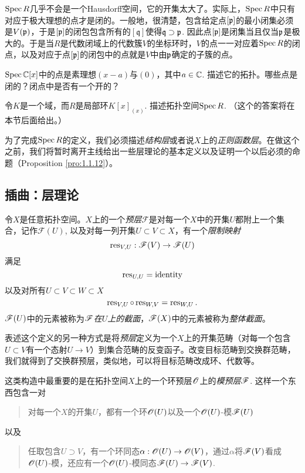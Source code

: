 $\operatorname{Spec} R$几乎不会是一个Hausdorff空间，它的开集太大了。实际上，$\operatorname{Spec} R$中只有对应于极大理想的点才是闭的。一般地，很清楚，包含给定点$[\mathfrak{p}]$的最小闭集必须是$V(\mathfrak{p})$，于是$[\mathfrak{p}]$的闭包包含所有的$[\mathfrak{q}]$使得$\mathfrak{q}\supset\mathfrak{p}$. 因此点$[\mathfrak{p}]$是闭集当且仅当$\mathfrak{p}$是极大的。于是当$R$是代数闭域上的代数簇$V$的坐标环时，$V$的点一一对应着$\operatorname{Spec} R$的闭点，以及对应于点$[\mathfrak{p}]$的闭包中的点就是$V$中由$\mathfrak{p}$确定的子簇的点。

\begin{exe}
	\begin{compactenum}[{(a)}]
		\item $\operatorname{Spec} \mathbb{C}[x]$中的点是素理想$(x-a)$与$(0)$，其中$a\in\mathbb{C}$. 描述它的拓扑。哪些点是闭的？闭点中是否有一个开的？
		\item 令$K$是一个域，而$R$是局部环$K[x]_{(x)}$. 描述拓扑空间$\operatorname{Spec} R$. （这个的答案将在本节后面给出。）
	\end{compactenum}
\end{exe}

为了完成$\operatorname{Spec} R$的定义，我们必须描述\textit{结构层}或者说$X$上的\textit{正则函数层}。在做这个之前，我们将暂时离开主线给出一些层理论的基本定义以及证明一个以后必须的命题（Proposition \ref{pro:1.1.12}）。

\subsection{插曲：层理论}

令$X$是任意拓扑空间。$X$上的一个\textit{预层}$\mathscr{F}$是对每一个$X$中的开集$U$都附上一个集合，记作$\mathscr{F}(U)$, 以及对每一列开集$U\subset V\subset X$，有一个\textit{限制映射}
\[
	\operatorname{res}_{V,U}:\mathscr{F}(V)\to \mathscr{F}(U)
\]
满足
\[
	\operatorname{res}_{U,U}=\mathrm{identity}
\]
以及对所有$U\subset V\subset W\subset X$
\[
	\operatorname{res}_{V,U}\circ \operatorname{res}_{W,V}=\operatorname{res}_{W,U}.
\]
$\mathscr{F}(U)$中的元素被称为\textit{$\mathscr{F}$在$U$上的截面}，$\mathscr{F}(X)$中的元素被称为\textit{整体截面}。

表述这个定义的另一种方式是将\textit{预层}定义为一个$X$上的开集范畴（对每一个包含$U\subset V$有一个态射$U\to V$）到集合范畴的反变函子。改变目标范畴到交换群范畴，我们就得到了交换群预层，类似地，可以将目标范畴改成环、代数等。

这类构造中最重要的是在拓扑空间$X$上的一个环预层$\mathscr{O}$上的\textit{模预层}$\mathscr{F}$. 这样一个东西包含一对
\begin{quote}
对每一个$X$的开集$U$，都有一个环$\mathscr{O}(U)$以及一个$\mathscr{O}(U)$-模$\mathscr{F}(U)$
\end{quote}
以及
\begin{quote}
任取包含$U\supset V$，有一个环同态$\alpha:\mathscr{O}(U)\to\mathscr{O}(V)$，通过$\alpha$将$\mathscr{F}(V)$看成$\mathscr{O}(U)$-模，还应有一个$\mathscr{O}(U)$-模同态$\mathscr{F}(U)\to\mathscr{F}(V)$.
\end{quote}

